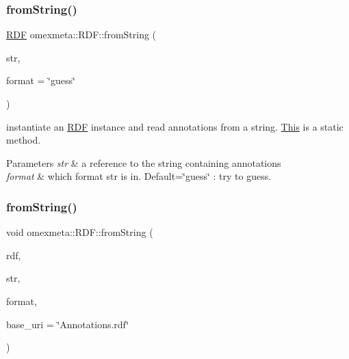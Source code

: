 \subsubsection{\texorpdfstring{from\+String()}{fromString()}\hspace{0.1cm}{\footnotesize\ttfamily [1/2]}}
{\footnotesize\ttfamily \hyperlink{classomexmeta_1_1RDF}{R\+DF} omexmeta\+::\+R\+D\+F\+::from\+String (\begin{DoxyParamCaption}\item[{const std\+::string \&}]{str,  }\item[{const std\+::string \&}]{format = {\ttfamily \char`\"{}guess\char`\"{}} }\end{DoxyParamCaption})\hspace{0.3cm}{\ttfamily [static]}}



instantiate an \hyperlink{classomexmeta_1_1RDF}{R\+DF} instance and read annotations from a string. \hyperlink{classThis}{This} is a static method. 


\begin{DoxyParams}{Parameters}
{\em str} & a reference to the string containing annotations \\
\hline
{\em format} & which format str is in. Default=\char`\"{}guess\char`\"{} \+: try to guess. \\
\hline
\end{DoxyParams}
\mbox{\label{classomexmeta_1_1RDF_ab2dadc7ff1cf25edbb401b2c879a21b0}} 
\subsubsection{\texorpdfstring{from\+String()}{fromString()}\hspace{0.1cm}{\footnotesize\ttfamily [2/2]}}
{\footnotesize\ttfamily void omexmeta\+::\+R\+D\+F\+::from\+String (\begin{DoxyParamCaption}\item[{\hyperlink{classomexmeta_1_1RDF}{R\+DF} $\ast$}]{rdf,  }\item[{const std\+::string \&}]{str,  }\item[{const std\+::string \&}]{format,  }\item[{std\+::string}]{base\+\_\+uri = {\ttfamily \char`\"{}Annotations.rdf\char`\"{}} }\end{DoxyParamCaption})\hspace{0.3cm}{\ttfamily [static]}}



